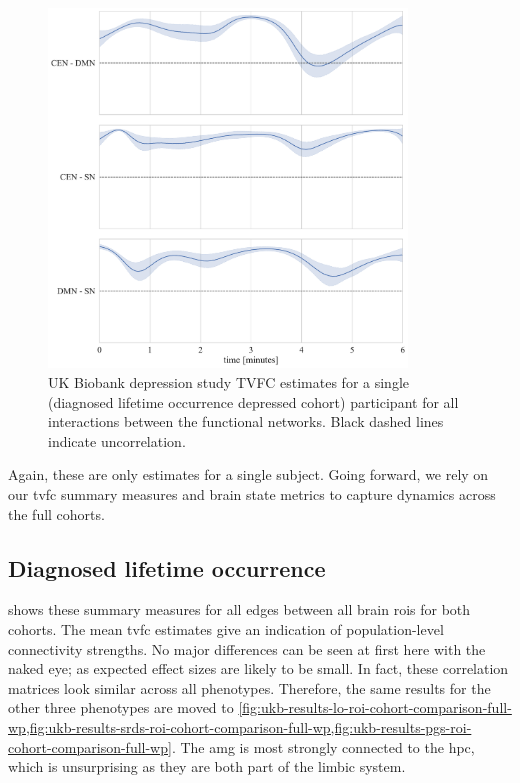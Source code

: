 \begin{figure}[ht]
  \centering
  \includegraphics[width=0.85\textwidth]{fig/ukbiobank/TVFC_predictions/FN/correlation_UKB1000211_TVFC_predictions}
  \caption{
    UK Biobank depression study TVFC estimates for a single (diagnosed lifetime occurrence depressed cohort) participant for all interactions between the functional networks.
    Black dashed lines indicate uncorrelation.
  }\label{fig:ukbiobank-example-correlation-estimates-fn}
\end{figure}


Again, these are only estimates for a single subject.
Going forward, we rely on our \gls{tvfc} summary measures and brain state metrics to capture dynamics across the full cohorts.

\subsection{Diagnosed lifetime occurrence}

 shows these summary measures for all edges between all brain \glspl{roi} for both cohorts.
The mean \gls{tvfc} estimates give an indication of population-level connectivity strengths.
No major differences can be seen at first here with the naked eye; as expected effect sizes are likely to be small.
In fact, these correlation matrices look similar across all phenotypes.
Therefore, the same results for the other three phenotypes are moved to \cref{fig:ukb-results-lo-roi-cohort-comparison-full-wp,fig:ukb-results-srds-roi-cohort-comparison-full-wp,fig:ukb-results-pgs-roi-cohort-comparison-full-wp}.
The \gls{amg} is most strongly connected to the \gls{hpc}, which is unsurprising as they are both part of the limbic system.


